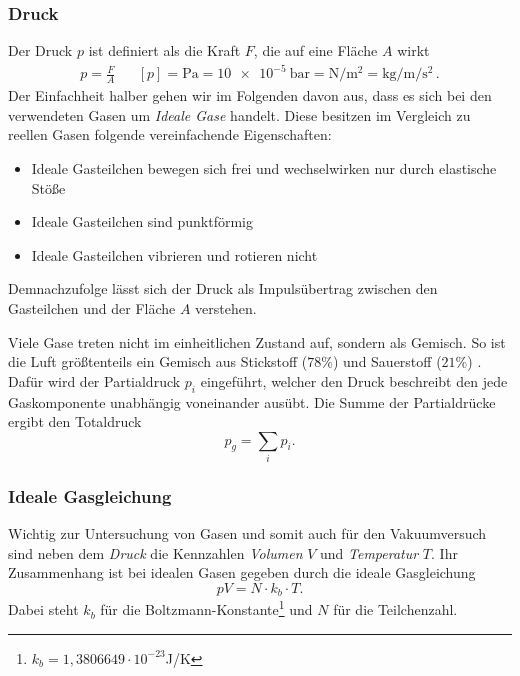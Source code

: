 \subsubsection{Druck}
Der Druck $p$ ist definiert als die Kraft $F$, die auf eine Fläche $A$ wirkt
\begin{align}
    p = \frac{F}{A}\label{eq:Druck} && [p] = \unit{\pascal} = \qty{10e-5}{\bar} = \unit{\newton\per\metre\squared} = \unit{\kilogram\per\metre\per\second\squared}\,.
\end{align}
Der Einfachheit halber gehen wir im Folgenden davon aus, 
dass es sich bei den verwendeten Gasen um \textit{Ideale Gase} handelt.
Diese besitzen im Vergleich zu reellen Gasen folgende vereinfachende Eigenschaften:
\begin{itemize}
    \item Ideale Gasteilchen bewegen sich frei und wechselwirken nur durch elastische Stöße
    \item Ideale Gasteilchen sind punktförmig
    \item Ideale Gasteilchen vibrieren und rotieren nicht 
\end{itemize}
Demnachzufolge lässt sich der Druck als Impulsübertrag zwischen den Gasteilchen und der Fläche $A$ verstehen.  

Viele Gase treten nicht im einheitlichen Zustand auf, sondern als Gemisch.
So ist die Luft größtenteils ein Gemisch aus Stickstoff ($78\%$) und Sauerstoff ($21\%$) \cite{luft}. 
Dafür wird der Partialdruck $p_i$ eingeführt, 
welcher den Druck beschreibt den jede Gaskomponente unabhängig voneinander ausübt.
Die Summe der Partialdrücke ergibt den Totaldruck
\begin{equation}
    p_g = \sum_i p_i.
\end{equation}

\subsubsection{Ideale Gasgleichung}
Wichtig zur Untersuchung von Gasen 
und somit auch für den Vakuumversuch sind neben dem \textit{Druck} die Kennzahlen \textit{Volumen} $V$
und \textit{Temperatur} $T$.
Ihr Zusammenhang ist bei idealen Gasen gegeben durch die ideale Gasgleichung
\begin{equation}
    pV=N\cdot k_b\cdot T. \label{eq:idealgaß}
\end{equation}
Dabei steht $k_b$ für die Boltzmann-Konstante\footnote{$k_b = 1,3806649\cdot10^{-23}$J/K} und $N$ für die Teilchenzahl.

